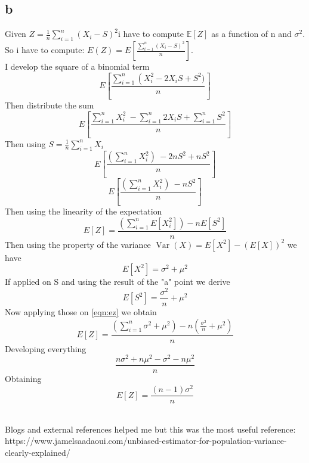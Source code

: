 \documentclass{article}
\begin{document}
\subsection{b}
Given $Z=\frac{1}{n} \sum_{i=1}^n\left(X_i-S\right)^2$i have to compute $\mathbb{E}[Z]$ as a function of n and $\sigma^2$.
So i have to compute: $E\left(Z\right)=E\left[\frac{\sum_{i=1}^n\left(X_i-S\right)^2}{n}\right]$.\\I develop the square of a binomial term$$E\left[\frac{\sum_{i=1}^n\left(X_i^2 -2X_i S +S^2)}{n}\right]$$
Then distribute the sum
$$E\left[\frac{\sum_{i=1}^n X_i^2 \ -\sum_{i=1}^n 2X_i S +\sum_{i=1}^n S^2}{n}\right]$$
Then using $S=\frac{1}{n} \sum_{i=1}^n X_i$
$$E\left[\frac{(\sum_{i=1}^n X_i^2) \ -2 nS^2 + nS^2}{n}\right]$$
$$E\left[\frac{(\sum_{i=1}^n X_i^2) \ - nS^2 }{n}\right]$$
Then using the linearity of the expectation
\begin{equation}
\label{eqn:ez}
    E[Z]=\frac{(\sum_{i=1}^nE[ X_i^2]) - nE[S^2]}{n}
\end{equation}
Then using the property of the variance $\operatorname{Var}(X)=E\left[X^2\right]-(E[X])^2$
we have $$E[X^2]=\sigma^2+\mu^2$$
If applied on S and using the result of the "a" point we derive
$$E[S^2]=\frac{\sigma^2}{n}+\mu^2$$
Now applying those on \ref{eqn:ez} we obtain
$$E[Z]=\frac{(\sum_{i=1}^n\sigma^2+\mu^2) - n(\frac{\sigma^2}{n}+\mu^2)}{n}$$
Developing everything
$$\frac{n\sigma^2+n\mu^2 - \sigma^2-n\mu^2}{n}$$
Obtaining
$$E[Z]=\frac{(n-1)\sigma^2}{n}$$

\\
Blogs and external references helped me but this was the most useful reference:\\
https://www.jamelsaadaoui.com/unbiased-estimator-for-population-variance-clearly-explained/
\end{document}
